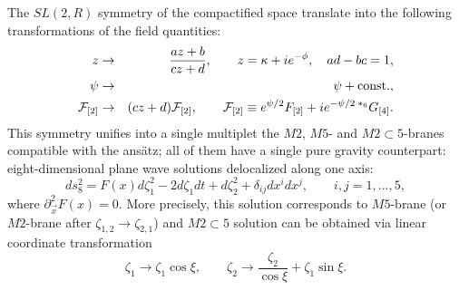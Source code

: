 \documentclass[a4paper,12pt]{article}
\begin{document}
The $SL(2,R)$ symmetry of the compactified space translate into
the following transformations of the field quantities:
\begin{eqnarray}\label{odin}
z &\to& \frac{az+b}{cz+d}, \qquad z = \kappa+ie^{-\phi}, \quad ad
- bc = 1, \\
\psi &\to& \psi + \hbox{const.}, \\
{\cal F}_{[2]} &\to& (cz+d){\cal F}_{[2]}, \qquad {\cal F}_{[2]}
\equiv e^{\psi/2} F_{[2]} + i e^{-\psi/2}\,{}^{*_6} G_{[4]}.
\label{dva}
\end{eqnarray}
This symmetry unifies into a single multiplet the $M2$, $M5$-
and $M2\subset 5$-branes compatible with the ans\"atz; all of
them have a single pure gravity counterpart: eight-dimensional
plane wave solutions delocalized along one axis:
\begin{equation}
ds_8^2 = F(x) d \zeta_1^2 - 2d\zeta_1 dt + d\zeta_2^2 +
\delta_{ij} dx^idx^j, \qquad i,j = 1,...,5,
\end{equation}
where $\partial_{\vec x}^2 F(x)=0$. More precisely, this
solution corresponds to $M5$-brane (or $M2$-brane after
$\zeta_{1,2} \to \zeta_{2,1}$) and $M2\subset 5$ solution can
be obtained via linear coordinate transformation
\begin{equation}
\zeta_1 \to \zeta_1\cos\xi, \qquad \zeta_2 \to
\frac{\zeta_2}{\cos\xi} + \zeta_1\sin\xi.
\end{equation}
\end{document}
